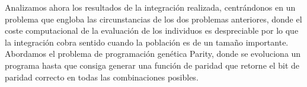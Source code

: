 Analizamos ahora los resultados de la integración realizada, centrándonos en un problema que engloba las circunstancias de los dos problemas anteriores, donde el coste computacional de la evaluación de los individuos es despreciable por lo que la integración cobra sentido cuando la población es de un tamaño importante. Abordamos el problema de programación genética Parity, donde se evoluciona un programa hasta que consiga generar una función de paridad que retorne el bit de paridad correcto en todas las combinaciones posibles.
